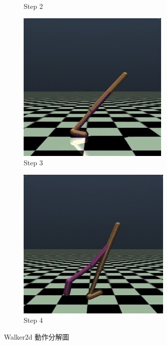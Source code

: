 \begin{figure}[h]
\begin{subfigure}[b]{0.24\textwidth}
        \caption{Step 2}
        \label{fig:walk2d_2}
    \end{subfigure}
    \hfill
    \begin{subfigure}[b]{0.24\textwidth}
        \centering
        \includegraphics[width=\textwidth]{figures/walk2d-3.png}
        \caption{Step 3}
        \label{fig:walk2d_3}
    \end{subfigure}
    \hfill
    \begin{subfigure}[b]{0.24\textwidth}
        \centering
        \includegraphics[width=\textwidth]{figures/walk2d-4.png}
        \caption{Step 4}
        \label{fig:walk2d_4}
    \end{subfigure}
    \caption{Walker2d 動作分解圖}
    \label{fig:walk2d_steps}
\end{figure}

